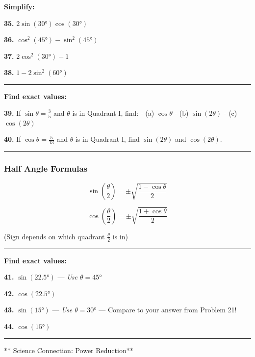 \documentclass[
  11pt,
]{article}
\begin{document}
\textbf{Simplify:}

\textbf{35.} \(2\sin(30°)\cos(30°)\)

\textbf{36.} \(\cos^2(45°) - \sin^2(45°)\)

\textbf{37.} \(2\cos^2(30°) - 1\)

\textbf{38.} \(1 - 2\sin^2(60°)\)

\begin{center}\rule{0.5\linewidth}{0.5pt}\end{center}

\textbf{Find exact values:}

\textbf{39.} If \(\sin\theta = \frac{3}{5}\) and \(\theta\) is in
Quadrant I, find: - (a) \(\cos\theta\) - (b) \(\sin(2\theta)\) - (c)
\(\cos(2\theta)\)

\textbf{40.} If \(\cos\theta = \frac{5}{13}\) and \(\theta\) is in
Quadrant I, find \(\sin(2\theta)\) and \(\cos(2\theta)\).

\begin{center}\rule{0.5\linewidth}{0.5pt}\end{center}

\hypertarget{half-angle-formulas}{%
\subsubsection{Half Angle Formulas}\label{half-angle-formulas}}

\[\sin\left(\frac{\theta}{2}\right) = \pm\sqrt{\frac{1 - \cos\theta}{2}}\]

\[\cos\left(\frac{\theta}{2}\right) = \pm\sqrt{\frac{1 + \cos\theta}{2}}\]

(Sign depends on which quadrant \(\frac{\theta}{2}\) is in)

\begin{center}\rule{0.5\linewidth}{0.5pt}\end{center}

\textbf{Find exact values:}

\textbf{41.} \(\sin(22.5°)\) --- \emph{Use \(\theta = 45°\)}

\textbf{42.} \(\cos(22.5°)\)

\textbf{43.} \(\sin(15°)\) --- \emph{Use \(\theta = 30°\)} --- Compare
to your answer from Problem 21!

\textbf{44.} \(\cos(15°)\)

\begin{center}\rule{0.5\linewidth}{0.5pt}\end{center}

** Science Connection: Power Reduction**
\end{document}
